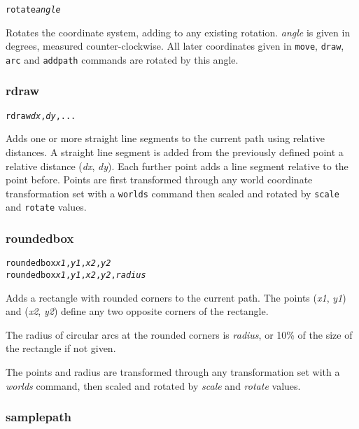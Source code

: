 \begin{alltt}
rotate \textit{angle}
\end{alltt}

Rotates the coordinate system, adding to any existing rotation.  \textit{angle}
is given in degrees, measured counter-clockwise.  All later coordinates given
in \texttt{move}, \texttt{draw}, \texttt{arc} and \texttt{addpath} commands are
rotated by this angle.

\subsubsection{rdraw}

\begin{alltt}
rdraw \textit{dx}, \textit{dy}, ...
\end{alltt}

Adds one or more straight line segments to the current path
using relative distances.
A straight line segment is added from the previously defined point
a relative distance (\textit{dx}, \textit{dy}).  Each further
point adds a line segment relative to the point before.
Points are first transformed through any world coordinate
transformation set with a \texttt{worlds} command
then scaled and rotated by \texttt{scale}
and \texttt{rotate} values.

\subsubsection{roundedbox}

\begin{alltt}
roundedbox \textit{x1}, \textit{y1}, \textit{x2}, \textit{y2}
roundedbox \textit{x1}, \textit{y1}, \textit{x2}, \textit{y2}, \textit{radius}
\end{alltt}

Adds a rectangle with rounded corners to the current path.
The points
(\textit{x1}, \textit{y1}) and (\textit{x2}, \textit{y2}) define
any two opposite corners of the rectangle.

The radius of circular arcs at the rounded corners is 
\textit{radius}, or 10\% of the size of the rectangle if not given.

The points and radius are transformed through any
transformation set with a \textit{worlds} command,
then scaled and rotated by \textit{scale}
and \textit{rotate} values.

\subsubsection{samplepath}

